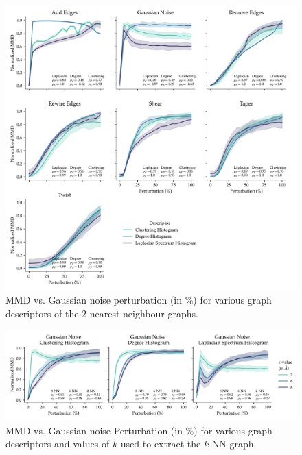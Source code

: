 \begin{figure}
  \centering
  \includegraphics[width=\textwidth]{./figures/results/res_1_3.pdf}
  \caption{MMD vs. Gaussian noise perturbation (in \%) for various graph descriptors of the
    2-nearest-neighbour graphs.}
  \label{fig:mmd_k_nn_graphs}
\end{figure}

\begin{figure}
  \includegraphics[width=\textwidth]{./figures/results/res_1_4.pdf}
  \caption{MMD vs. Gaussian noise Perturbation (in \%) for various graph
    descriptors and values of $k$ used to extract the $k$-NN graph.}
  \label{fig:k_vs_turbulence_gaussian_noise}

\end{figure}


